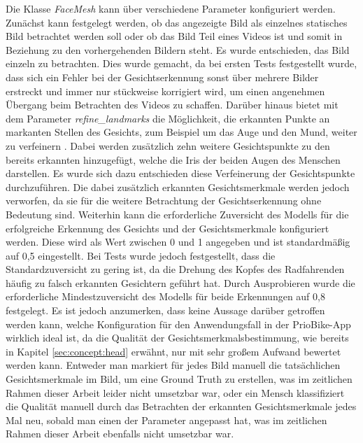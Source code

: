 Die Klasse \textit{FaceMesh} kann über verschiedene Parameter konfiguriert werden. Zunächst kann festgelegt werden, ob das angezeigte Bild als einzelnes statisches Bild betrachtet werden soll oder ob das Bild Teil eines Videos ist und somit in Beziehung zu den vorhergehenden Bildern steht. Es wurde entschieden, das Bild einzeln zu betrachten. Dies wurde gemacht, da bei ersten Tests festgestellt wurde, dass sich ein Fehler bei der Gesichtserkennung sonst über mehrere Bilder erstreckt und immer nur stückweise korrigiert wird, um einen angenehmen Übergang beim Betrachten des Videos zu schaffen.
Darüber hinaus bietet \mediapipe mit dem Parameter \textit{refine\_landmarks} die Möglichkeit, die erkannten Punkte an markanten Stellen des Gesichts, zum Beispiel um das Auge und den Mund, weiter zu verfeinern \cite{paper:mediapipe:attention}. Dabei werden zusätzlich zehn weitere Gesichtspunkte zu den bereits erkannten hinzugefügt, welche die Iris der beiden Augen des Menschen darstellen. Es wurde sich dazu entschieden diese Verfeinerung der Gesichtspunkte durchzuführen. Die dabei zusätzlich erkannten Gesichtsmerkmale werden jedoch verworfen, da sie für die weitere Betrachtung der Gesichtserkennung ohne Bedeutung sind.
Weiterhin kann die erforderliche Zuversicht des Modells für die erfolgreiche Erkennung des Gesichts und der Gesichtsmerkmale konfiguriert werden. Diese wird als Wert zwischen 0 und 1 angegeben und ist standardmäßig auf 0,5 eingestellt. Bei Tests wurde jedoch festgestellt, dass die Standardzuversicht zu gering ist, da die Drehung des Kopfes des Radfahrenden häufig zu falsch erkannten Gesichtern geführt hat. Durch Ausprobieren wurde die erforderliche Mindestzuversicht des Modells für beide Erkennungen auf 0,8 festgelegt. Es ist jedoch anzumerken, dass keine Aussage darüber getroffen werden kann, welche Konfiguration für den Anwendungsfall in der PrioBike-App wirklich ideal ist, da die Qualität der Gesichtsmerkmalsbestimmung, wie bereits in Kapitel \ref{sec:concept:head} erwähnt, nur mit sehr großem Aufwand bewertet werden kann. Entweder man markiert für jedes Bild manuell die tatsächlichen Gesichtsmerkmale im Bild, um eine Ground Truth zu erstellen, was im zeitlichen Rahmen dieser Arbeit leider nicht umsetzbar war, oder ein Mensch klassifiziert die Qualität manuell durch das Betrachten der erkannten Gesichtsmerkmale jedes Mal neu, sobald man einen der Parameter angepasst hat, was im zeitlichen Rahmen dieser Arbeit ebenfalls nicht umsetzbar war.

